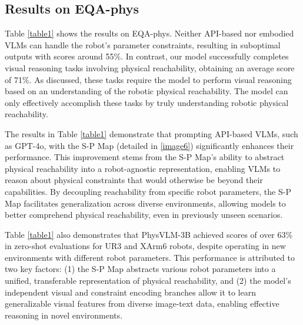 \documentclass[10pt,twocolumn,letterpaper]{article}
\begin{document}
\subsection{Results on EQA-phys}
Table \ref{table1} shows the results on EQA-phys. Neither API-based nor embodied VLMs can handle the robot's parameter constraints, resulting in suboptimal outputs with scores around 55\%. In contrast, our model successfully completes visual reasoning tasks involving physical reachability, obtaining an average score of 71\%. As discussed, these tasks require the model to perform visual reasoning based on an understanding of the robotic physical reachability. The model can only effectively accomplish these tasks by truly understanding robotic physical reachability.

The results in Table \ref{table1} demonstrate that prompting API-based VLMs, such as GPT-4o, with the S-P Map (detailed in \ref{image6}) significantly enhances their performance. This improvement stems from the S-P Map's ability to abstract physical reachability into a robot-agnostic representation, enabling VLMs to reason about physical constraints that would otherwise be beyond their capabilities. By decoupling reachability from specific robot parameters, the S-P Map facilitates generalization across diverse environments, allowing models to better comprehend physical reachability, even in previously unseen scenarios.

Table \ref{table1} also demonstrates that PhysVLM-3B achieved scores of over 63\% in zero-shot evaluations for UR3 and XArm6 robots, despite operating in new environments with different robot parameters. This performance is attributed to two key factors: (1) the S-P Map abstracts various robot parameters into a unified, transferable representation of physical reachability, and (2) the model's independent visual and constraint encoding branches allow it to learn generalizable visual features from diverse image-text data, enabling effective reasoning in novel environments.
\end{document}
